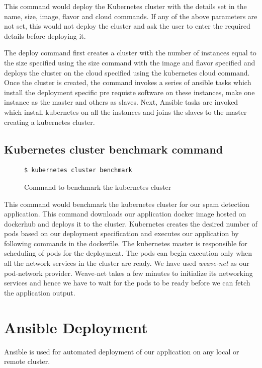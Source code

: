 \documentclass[9pt,twocolumn,twoside]{../../styles/osajnl}
\begin{document}
{This command would deploy the Kubernetes cluster with the details set
in the name, size, image, flavor and cloud commands. If any of the
above parameters are not set, this would not deploy the cluster and
ask the user to enter the required details before deploying it.

\noindent
The deploy command first creates a cluster with the number of
instances equal to the size specified using the size command with the
image and flavor specified and deploys the cluster on the cloud
specified using the kubernetes cloud command. Once the cluster is
created, the command invokes a series of ansible tasks which install
the deployment specific pre requiste software on these instances, make
one instance as the master and others as slaves. Next, Ansible tasks
are invoked which install kubernetes on all the instances and joins
the slaves to the master creating a kubernetes cluster.

\subsection{Kubernetes cluster benchmark command}
\begin{figure}[H]
\begin{verbatim}
$ kubernetes cluster benchmark
\end{verbatim}
\caption{Command to benchmark the kubernetes cluster}
\vspace{-4mm}
\label{Command to benchmark the kubernetes cluster}
\end{figure}

This command would benchmark the kubernetes cluster for our spam
detection application. This command downloads our application docker
image hosted on dockerhub and deploys it to the cluster. Kubernetes
creates the desired number of pods based on our deployment
specification and executes our application by following commands in
the dockerfile. The kubernetes master is responsible for scheduling of
pods for the deployment. The pods can begin execution only when all
the network services in the cluster are ready. We have used
\emph{weave-net} as our pod-network provider. Weave-net takes a few
minutes to initialize its networking services and hence we have to
wait for the pods to be ready before we can fetch the application
output.

\section{Ansible Deployment}
Ansible is used for automated deployment of our application on any
local or remote cluster.

}
\end{document}
